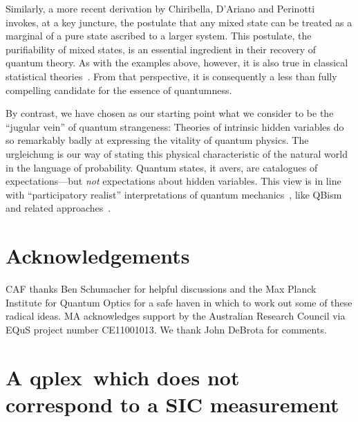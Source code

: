 \documentclass[aps,pra,superscriptaddress,10pt,tightenlines,twocolumn,nofootinbib]{revtex4}
\theoremstyle{remark}
\newcommand{\qplex}{qplex}
\begin{document}
Similarly, a more recent derivation by Chiribella, D'Ariano and
Perinotti~\cite{chiribella11} invokes, at a key juncture, the
postulate that any mixed state can be treated as a marginal of a pure
state ascribed to a larger system.  This postulate, the purifiability
of mixed states, is an essential ingredient in their recovery of
quantum theory.  As with the examples above, however, it is also true
in classical statistical theories~\cite{spekkens2007, bartlett2012,
  spekkens2014, disilvestro2016}.  From that perspective, it is
consequently a less than fully compelling candidate for the essence of
quantumness.

By contrast, we have chosen as our starting point what we consider to
be the ``jugular vein'' of quantum strangeness: Theories of intrinsic
hidden variables do so remarkably badly at expressing the vitality of
quantum physics.  The urgleichung is our way of stating this physical
characteristic of the natural world in the language of probability.
Quantum states, it avers, are catalogues of expectations---but
\emph{not} expectations about hidden variables.  This view is in line
with ``participatory realist'' interpretations of quantum
mechanics~\cite{cabello2015, fuchs2016}, like QBism~\cite{fuchs2013,
  Voldemort, FMS-AJP} and related approaches~\cite{zeilinger2005, kofler2010,
  appleby2013}.
  
\section{Acknowledgements}

CAF thanks Ben Schumacher for helpful discussions and the Max Planck
Institute for Quantum Optics for a safe haven in which to work out
some of these radical ideas.  MA acknowledges support by the
Australian Research Council via EQuS project number CE11001013.  We
thank John DeBrota for comments.

\appendix
\section{A \qplex\ which does not correspond to a SIC measurement}
\label{sec:altQplex}
\end{document}
